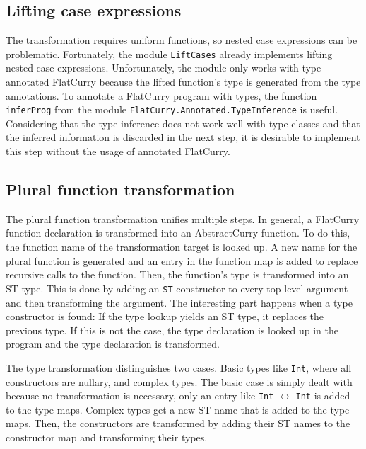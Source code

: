 \documentclass[a4paper, 11pt, fleqn]{scrreprt}
\newcommand{\cinline}[1]{\texttt{#1}}
\begin{document}
\subsection{Lifting case expressions}
The transformation requires uniform functions, so nested case expressions can be problematic. Fortunately, the module \cinline{LiftCases} already implements lifting nested case expressions. Unfortunately, the module only works with type-annotated FlatCurry because the lifted function's type is generated from the type annotations. To annotate a FlatCurry program with types, the function \cinline{inferProg} from the module \cinline{FlatCurry.Annotated.TypeInference} is useful. Considering that the type inference does not work well with type classes and that the inferred information is discarded in the next step, it is desirable to implement this step without the usage of annotated FlatCurry.

\subsection{Plural function transformation}
The plural function transformation unifies multiple steps. In general, a FlatCurry function declaration is transformed into an AbstractCurry function. To do this, the function name of the transformation target is looked up. A new name for the plural function is generated and an entry in the function map is added to replace recursive calls to the function. Then, the function's type is transformed into an ST type. This is done by adding an \cinline{ST} constructor to every top-level argument and then transforming the argument. The interesting part happens when a type constructor is found: If the type lookup yields an ST type, it replaces the previous type. If this is not the case, the type declaration is looked up in the program and the type declaration is transformed.

The type transformation distinguishes two cases. Basic types like \cinline{Int}, where all constructors are nullary, and complex types. The basic case is simply dealt with because no transformation is necessary, only an entry like \cinline{Int} $\longleftrightarrow$ \cinline{Int} is added to the type maps. Complex types get a new ST name that is added to the type maps. Then, the constructors are transformed by adding their ST names to the constructor map and transforming their types.
\end{document}
